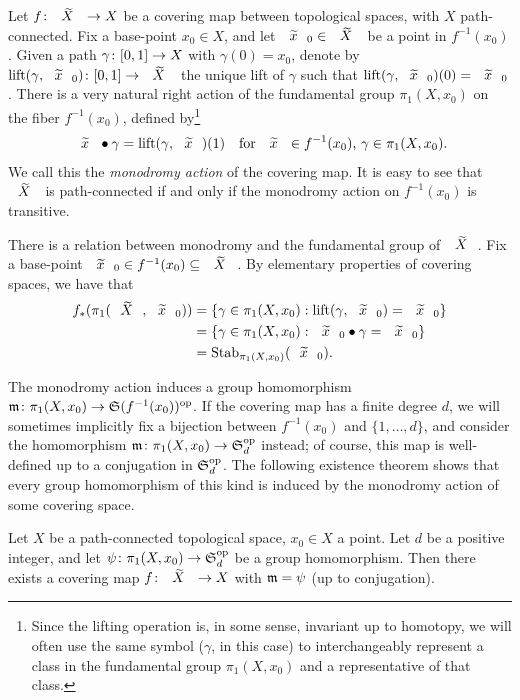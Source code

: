 Let $\map{f}{\wtilde{X}}{X}$ be a covering map between topological spaces, with $X$ path-connected. Fix a base-point $x_0\in X$, and let $\wtilde{x}_0\in\wtilde{X}$ be a point in $f^{-1}(x_0)$. Given a path $\map{\gamma}{[0,1]}{X}$ with $\gamma(0)=x_0$, denote by $\map{\lift{\gamma}{\wtilde{x}_0}}{[0,1]}{\wtilde{X}}$ the unique lift of $\gamma$ such that $\lift{\gamma}{\wtilde{x}_0}(0)=\wtilde{x}_0$. There is a very natural right action of the fundamental group $\pi_1(X,x_0)$ on the fiber $f^{-1}(x_0)$, defined by\footnote{Since the lifting operation is, in some sense, invariant up to homotopy, we will often use the same symbol ($\gamma$, in this case) to interchangeably represent a class in the fundamental group $\pi_1(X,x_0)$ and a representative of that class.}
\begin{align*}
\wtilde{x}\mon\gamma=\lift{\gamma}{\wtilde{x}}(1)&&\text{for $\wtilde{x}\in f^{-1}(x_0)$, $\gamma\in\pi_1(X,x_0)$.}
\end{align*}
We call this the \emph{monodromy action} of the covering map. It is easy to see that $\wtilde{X}$ is path-connected if and only if the monodromy action on $f^{-1}(x_0)$ is transitive.

There is a relation between monodromy and the fundamental group of $\wtilde{X}$. Fix a base-point $\wtilde{x}_0\in f^{-1}(x_0)\subs\wtilde{X}$. By elementary properties of covering spaces, we have that
\begin{align*}
f_*(\pi_1(\wtilde{X},\wtilde{x}_0))&=\{\gamma\in\pi_1(X,x_0):\lift{\gamma}{\wtilde{x}_0}=\wtilde{x}_0\}\\
&=\{\gamma\in\pi_1(X,x_0):\wtilde{x}_0\mon\gamma=\wtilde{x}_0\}\\
&=\stab{\pi_1(X,x_0)}{\wtilde{x}_0}.
\end{align*}

The monodromy action induces a group homomorphism $\map{\Mon}{\pi_1(X,x_0)}{\op{\symgroup(f^{-1}(x_0))}}$. If the covering map has a finite degree $d$, we will sometimes implicitly fix a bijection between $f^{-1}(x_0)$ and $\{1,\ldots,d\}$, and consider the homomorphism $\map{\Mon}{\pi_1(X,x_0)}{\op{\symgroup[d]}}$ instead; of course, this map is well-defined up to a conjugation in $\op{\symgroup[d]}$. The following existence theorem shows that every group homomorphism of this kind is induced by the monodromy action of some covering space.

\begin{theorem}\label{hurwitz:th:covering-with-given-monodromy}
Let $X$ be a path-connected topological space, $x_0\in X$ a point. Let $d$ be a positive integer, and let $\map{\psi}{\pi_1(X,x_0)}{\op{\symgroup[d]}}$ be a group homomorphism. Then there exists a covering map $\map{f}{\wtilde{X}}{X}$ with $\mathfrak{m}=\psi$ (up to conjugation).
\end{theorem}


